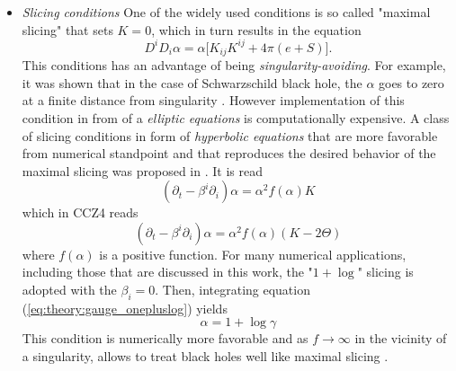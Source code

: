\begin{itemize}
    \item \textit{Slicing conditions} 
    One of the widely used conditions is so called "maximal slicing" that sets $K=0$, which in turn results in the equation
    \begin{equation}
    D^{i}D_{i}\alpha = \alpha\big[K_{ij}K^{ij} + 4\pi(e+S)\big].
    \end{equation}
    This conditions has an advantage of being \textit{singularity-avoiding}. 
    For example, it was shown that in the case of Schwarzschild black hole, the $\alpha$ goes to zero at a finite distance from singularity \cite{Geyer:1995}. 
    However implementation of this condition in from of a \textit{elliptic equations} is computationally expensive.
    A class of slicing conditions in form of \textit{hyperbolic equations} that are more favorable from numerical standpoint and that reproduces the desired behavior of the maximal slicing was proposed in \cite{Bona:1994dr}. It is read 
    \begin{equation}
    (\partial_t - \beta^i\partial_i)\alpha = \alpha^2 f(\alpha)K
    \label{eq:theory:gauge_onepluslog}
    \end{equation}
    which in CCZ4 reads 
    \begin{equation}
    (\partial_t - \beta^i \partial_i )\alpha = \alpha^2 f(\alpha)(K-2\Theta)
    \end{equation}
    where $f(\alpha)$ is a positive function. 
    For many numerical applications, including those that are discussed in this work, the "$1 + \log$" slicing is adopted with the $\beta_i=0$. 
    Then, integrating equation (\ref{eq:theory:gauge_onepluslog}) yields 
    \begin{equation}
    \alpha = 1 + \log\gamma
    \end{equation}
    This condition is numerically more favorable and as $f\rightarrow\infty$ in the vicinity of a singularity, allows to treat black holes well like maximal slicing \cite{Baumgarte:2002jm}.
    

\end{itemize}
